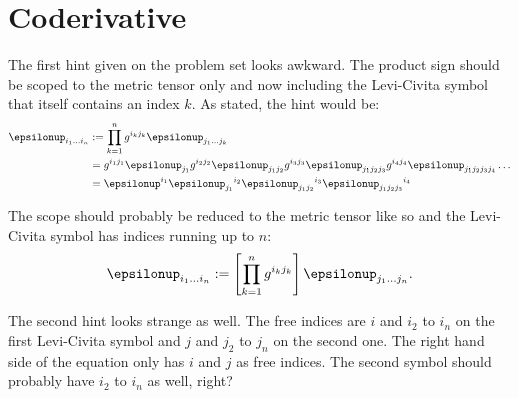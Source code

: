\documentclass[11pt, english, fleqn, DIV=15, headinclude, BCOR=1cm]{scrartcl}
\begin{document}
\section{Coderivative}
\label{homework:2}

The first hint given on the problem set looks awkward. The product sign should
be scoped to the metric tensor only and now including the Levi-Civita symbol
that itself contains an index $k$. As stated, the hint would be:
\begin{align*}
    \epsilonup_{i_1 \ldots i_n}
    &:= \prod_{k=1}^n g^{i_k j_k} \epsilonup_{j_1 \ldots j_k} \\
    &=
    g^{i_1 j_1} \epsilonup_{j_1}
    g^{i_2 j_2} \epsilonup_{j_1 j_2}
    g^{i_3 j_3} \epsilonup_{j_1 j_2 j_3}
    g^{i_4 j_4} \epsilonup_{j_1 j_2 j_3 j_4} \ldots \\
    &=
    \epsilonup^{i_1}
    \epsilonup_{j_1}{}^{i_2}
    \epsilonup_{j_1 j_2}{}^{i_3}
    \epsilonup_{j_1 j_2 j_3}{}^{i_4}
\end{align*}

The scope should probably be reduced to the metric tensor like so and the
Levi-Civita symbol has indices running up to $n$:
\[
    \epsilonup_{i_1 \ldots i_n}
    := \sbr{\prod_{k=1}^n g^{i_k j_k}} \epsilonup_{j_1 \ldots j_n}.
\]

The second hint looks strange as well. The free indices are $i$ and $i_2$ to
$i_n$ on the first Levi-Civita symbol and $j$ and $j_2$ to $j_n$ on the second
one. The right hand side of the equation only has $i$ and $j$ as free indices.
The second symbol should probably have $i_2$ to $i_n$ as well, right?
\end{document}
